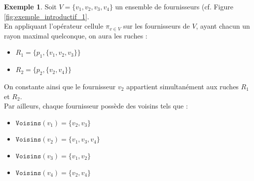 \documentclass[a4paper,12pt]{book}
\theoremstyle{break}
\theoremstyle{break}
\theoremstyle{break}
\theoremstyle{break}
\theoremstyle{definition}
\newtheorem*{example}{Exemple}
\theoremstyle{remark}
\begin{document}
\begin{example}
Soit $V = \{v_1, v_2, v_3, v_4\}$ un ensemble de fournisseurs (cf. Figure \ref{fig:exemple_introductif_1}.\\
En appliquant l'opérateur cellule $\pi_{v \in V}$ sur les fournisseurs de $V$, ayant chacun un rayon maximal quelconque, on aura les ruches :
\begin{itemize}
  \item{$R_1 = \{p_1, \{v_1, v_2, v_3\}\}$}
  \item{$R_2 = \{p_2, \{v_2, v_4\}\}$}
\end{itemize}
On constante ainsi que le fournisseur $v_2$ appartient simultanément aux ruches $R_1$ et $R_2$.\\
Par ailleurs, chaque fournisseur possède des voisins tels que :
\begin{itemize}
  \item{$\texttt{Voisins}(v_1) = \{v_2, v_3\}$}
  \item{$\texttt{Voisins}(v_2) = \{v_1, v_3, v_4\}$}
  \item{$\texttt{Voisins}(v_3) = \{v_1, v_2\}$}
  \item{$\texttt{Voisins}(v_4) = \{v_2, v_4\}$}
\end{itemize}
\end{example}
\end{document}
